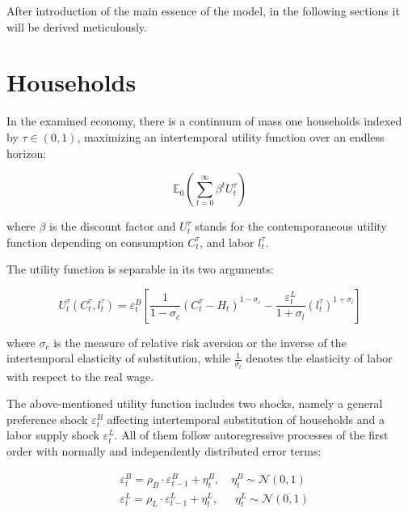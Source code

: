 \documentclass{pracamgr}
\numberwithin{equation}{section}
\begin{document}
After introduction of the main essence of the \citet{smets2003estimated}  model, in the following sections it will be derived meticulously.

\section{Households} \label{DSGE - Households}

In the examined economy, there is a continuum of mass one households indexed by $\tau \in (0,1)$, maximizing an intertemporal utility function over an endless horizon:

\begin{equation}
 \mathbb{E}_{0} \left(\sum\limits_{t=0}^{\infty} \beta^{t} U_{t}^{\tau} \right) 
\end{equation}

where $\beta$ is the discount factor and $U_{t}^{\tau}$ stands for the contemporaneous utility
function depending on consumption $C_{t}^{\tau}$, and labor $l_{t}^{\tau}$.

The utility function is separable in its two arguments:

\begin{equation}
U_{t}^{\tau} \left( C_{t}^{\tau}, l_{t}^{\tau} \right) = \varepsilon^{B}_{t} \left[ \frac{1}{1-\sigma_{c}} \left( C_{t}^{\tau} - H_{t} \right)^{1-\sigma_{c}} - \frac{\varepsilon_{t}^{L}}{1+\sigma_{l}} \left( l_{t}^{\tau} \right)^{1+\sigma_{l}} \right]
\end{equation}

where $\sigma_{c}$ is the measure of relative risk aversion or the inverse of the intertemporal elasticity of substitution, while $\frac{1}{\sigma_{l}}$ denotes the elasticity of labor with respect to the real wage.

The above-mentioned utility function includes two shocks, namely a general preference shock $\varepsilon^{B}_{t}$ affecting intertemporal substitution of households and a labor supply shock $\varepsilon^{L}_{t}$. All of them follow autoregressive processes of the first order with normally and independently distributed error terms:

\begin{align}
& \varepsilon^{B}_{t} = \rho_{B} \cdot \varepsilon^{B}_{t-1}+ \eta_{t}^{B}, \enspace \enspace \eta_{t}^{B} \sim \mathcal{N}(0,1) \\
& \varepsilon^{L}_{t} = \rho_{L} \cdot \varepsilon^{L}_{t-1}+ \eta_{t}^{L}, \enspace \enspace\enspace \eta_{t}^{L} \sim \mathcal{N}(0,1) 
\end{align}
\end{document}
